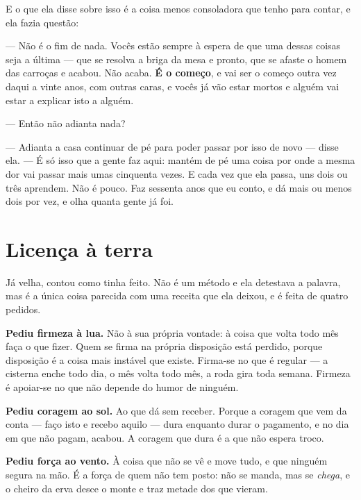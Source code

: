 \documentclass[livro.tex]{subfiles}
\begin{document}
E o que ela disse sobre isso é a coisa menos consoladora que tenho para contar, e ela fazia questão:

--- Não é o fim de nada. Vocês estão sempre à espera de que uma dessas coisas seja a última ---
que se resolva a briga da mesa e pronto, que se afaste o homem das carroças e acabou. Não acaba.
\textbf{É o começo}, e vai ser o começo outra vez daqui a vinte anos, com outras caras, e vocês
já vão estar mortos e alguém vai estar a explicar isto a alguém.

--- Então não adianta nada?

--- Adianta a casa continuar de pé para poder passar por isso de novo --- disse ela. --- É só
isso que a gente faz aqui: mantém de pé uma coisa por onde a mesma dor vai passar mais umas
cinquenta vezes. E cada vez que ela passa, uns dois ou três aprendem. Não é pouco. Faz sessenta
anos que eu conto, e dá mais ou menos dois por vez, e olha quanta gente já foi.

\chapter{Licença à terra}

Já velha, contou como tinha feito. Não é um método e ela detestava a palavra, mas é a única
coisa parecida com uma receita que ela deixou, e é feita de quatro pedidos.

\medskip

\textbf{Pediu firmeza à lua.} Não à sua própria vontade: à coisa que volta todo mês faça o que
fizer. Quem se firma na própria disposição está perdido, porque disposição é a coisa mais
instável que existe. Firma-se no que é regular --- a cisterna enche todo dia, o mês volta todo
mês, a roda gira toda semana. Firmeza é apoiar-se no que não depende do humor de ninguém.

\textbf{Pediu coragem ao sol.} Ao que dá sem receber. Porque a coragem que vem da conta ---
faço isto e recebo aquilo --- dura enquanto durar o pagamento, e no dia em que não pagam,
acabou. A coragem que dura é a que não espera troco.

\textbf{Pediu força ao vento.} À coisa que não se vê e move tudo, e que ninguém segura na mão. É
a força de quem não tem posto: não se manda, mas se \emph{chega}, e o cheiro da erva desce o monte
e traz metade dos que vieram.
\end{document}

